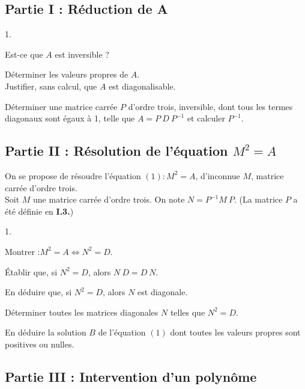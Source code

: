 \documentclass[11pt]{article}%
\begin{document}
\subsection*{ Partie I : Réduction de A}

\begin{noliste}{1.}
 \setlength{\itemsep}{4mm}
\item Est-ce que $A$ est inversible ?

\item Déterminer les valeurs propres de $A$.\\
Justifier, sans calcul, que $A$ est diagonalisable.

\item Déterminer une matrice carrée $P$ d'ordre trois, inversible,
dont tous les termes diagonaux sont égaux à 1, telle que $A =
P~D~P^{-1}$ et calculer $P^{-1}$.
\end{noliste}

\subsection*{Partie II : Résolution de l'équation $M^{2} = A$}

On se propose de résoudre l'équation $\left( 1\right) :M^{2} = A$,
d'inconnue $M$, matrice carrée d'ordre trois.\\
Soit $M$ une matrice carrée d'ordre trois. On note $N = P^{-1}M~P$. (La
matrice $P$ a été définie en \textbf{I.3.})

\begin{noliste}{1.}
 \setlength{\itemsep}{4mm}
\item Montrer :\texttt{\hspace*{1cm}}$M^{2} = A\Longleftrightarrow
N^{2} = D$.

\item Établir que, si $N^{2} = D$, alors $N~D = D~N$.

\item En déduire que, si $N^{2} = D$, alors $N$ est diagonale.

\item Déterminer toutes les matrices diagonales $N$ telles que $N^{2} =
D$.

\item En déduire la solution $B$ de l'équation $\left( 1\right) $
dont toutes les valeurs propres sont positives ou nulles.
\end{noliste}

\subsection*{Partie III : Intervention d'un polyn\^{o}me}
\end{document}
